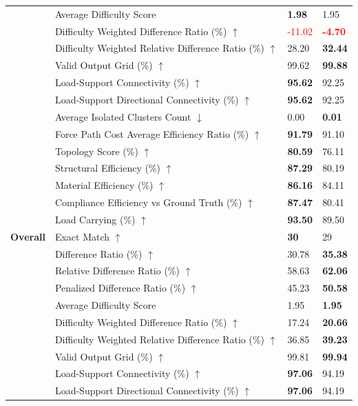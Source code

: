 \begin{table}[!h]
{\begin{tabular}{llll}
 & Average Difficulty Score & \textbf{1.98} & 1.95 \\
 & Difficulty Weighted Difference Ratio (\%) $\uparrow$ & \textcolor{red}{-11.02} & \textbf{\textcolor{red}{-4.70}} \\
 & Difficulty Weighted Relative Difference Ratio (\%) $\uparrow$ & 28.20 & \textbf{32.44} \\
 & Valid Output Grid (\%) $\uparrow$ & 99.62 & \textbf{99.88} \\
 & Load-Support Connectivity (\%) $\uparrow$ & \textbf{95.62} & 92.25 \\
 & Load-Support Directional Connectivity (\%) $\uparrow$ & \textbf{95.62} & 92.25 \\
 & Average Isolated Clusters Count $\downarrow$ & 0.00 & \textbf{0.01} \\
 & Force Path Cost Average Efficiency Ratio (\%) $\uparrow$ & \textbf{91.79} & 91.10 \\
 & Topology Score (\%) $\uparrow$ & \textbf{80.59} & 76.11 \\
 & Structural Efficiency (\%) $\uparrow$ & \textbf{87.29} & 80.19 \\
 & Material Efficiency (\%) $\uparrow$ & \textbf{86.16} & 84.11 \\
 & Compliance Efficiency vs Ground Truth (\%) $\uparrow$ & \textbf{87.47} & 80.41 \\
 & Load Carrying (\%) $\uparrow$ & \textbf{93.50} & 89.50 \\
\midrule\midrule
\textbf{Overall} & Exact Match $\uparrow$ & \textbf{30} & 29 \\
 & Difference Ratio (\%) $\uparrow$ & 30.78 & \textbf{35.38} \\
 & Relative Difference Ratio (\%) $\uparrow$ & 58.63 & \textbf{62.06} \\
 & Penalized Difference Ratio (\%) $\uparrow$ & 45.23 & \textbf{50.58} \\
 & Average Difficulty Score & 1.95 & \textbf{1.95} \\
 & Difficulty Weighted Difference Ratio (\%) $\uparrow$ & 17.24 & \textbf{20.66} \\
 & Difficulty Weighted Relative Difference Ratio (\%) $\uparrow$ & 36.85 & \textbf{39.23} \\
 & Valid Output Grid (\%) $\uparrow$ & 99.81 & \textbf{99.94} \\
 & Load-Support Connectivity (\%) $\uparrow$ & \textbf{97.06} & 94.19 \\
 & Load-Support Directional Connectivity (\%) $\uparrow$ & \textbf{97.06} & 94.19 \\

\end{tabular}}
\end{table}

